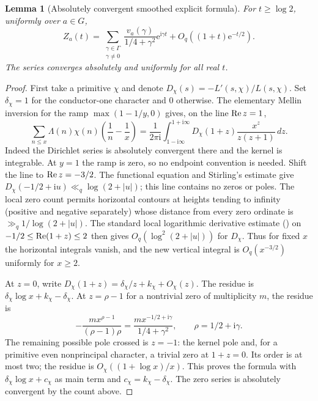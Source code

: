 \documentclass[11pt]{article}
\newtheorem{lemma}[theorem]{Lemma}
\theoremstyle{remark}\newtheorem{remark}[theorem]{Remark}
\newcommand{\ii}{\mathrm i}\newcommand{\e}{\mathrm e}\newcommand{\ph}{\varphi}
\begin{document}
\begin{lemma}[Absolutely convergent smoothed explicit formula]\label{lem:exp}
For $t\ge\log 2$, uniformly over $a\in G$,
\begin{equation}\label{eq:explicit}
 Z_a(t)=\sum_{\substack{\gamma\in\Gamma\\\gamma\ne0}}
       \frac{v_a(\gamma)}{1/4+\gamma^2}\e^{\ii\gamma t}
       +O_q((1+t)\e^{-t/2}).
\end{equation}
The series converges absolutely and uniformly for all real $t$.
\end{lemma}
\begin{proof}
First take a primitive $\chi$ and denote $D_\chi(s)=-L'(s,\chi)/L(s,\chi)$. Set $\delta_\chi=1$ for the conductor-one character and $0$ otherwise. The elementary Mellin inversion for the ramp $\max(1-1/y,0)$ gives, on the line $\operatorname{Re} z=1$,
\begin{equation}\label{eq:perron}
 \sum_{n\le x}\Lambda(n)\chi(n)\left(\frac1n-\frac1x\right)
 =\frac1{2\pi\ii}\int_{1-\ii\infty}^{1+\ii\infty}
        D_\chi(1+z)\frac{x^z}{z(z+1)}\,dz.
\end{equation}
Indeed the Dirichlet series is absolutely convergent there and the kernel is integrable. At $y=1$ the ramp is zero, so no endpoint convention is needed. Shift the line to $\operatorname{Re} z=-3/2$. The functional equation and Stirling's estimate give $D_\chi(-1/2+\ii u)\ll_q\log(2+|u|)$; this line contains no zeros or poles. The local zero count permits horizontal contours at heights tending to infinity (positive and negative separately) whose distance from every zero ordinate is $\gg_q1/\log(2+|u|)$. The standard local logarithmic derivative estimate (\cite[Lemmas 12.1, 12.6]{mv}) on $-1/2\le\operatorname{Re}(1+z)\le2$ then gives $O_q(\log^2(2+|u|))$ for $D_\chi$. Thus for fixed $x$ the horizontal integrals vanish, and the new vertical integral is $O_q(x^{-3/2})$ uniformly for $x\ge2$.

At $z=0$, write $D_\chi(1+z)=\delta_\chi/z+k_\chi+O_\chi(z)$. The residue is $\delta_\chi\log x+k_\chi-\delta_\chi$. At $z=\rho-1$ for a nontrivial zero of multiplicity $m$, the residue is
\[
 -\frac{m x^{\rho-1}}{(\rho-1)\rho}
 =\frac{m x^{-1/2+\ii\gamma}}{1/4+\gamma^2},\qquad \rho=1/2+\ii\gamma.
\]
The remaining possible pole crossed is $z=-1$: the kernel pole and, for a primitive even nonprincipal character, a trivial zero at $1+z=0$. Its order is at most two; the residue is $O_\chi((1+\log x)/x)$. This proves the formula with $\delta_\chi\log x+c_\chi$ as main term and $c_\chi=k_\chi-\delta_\chi$. The zero series is absolutely convergent by the count above.


\end{proof}
\end{document}
